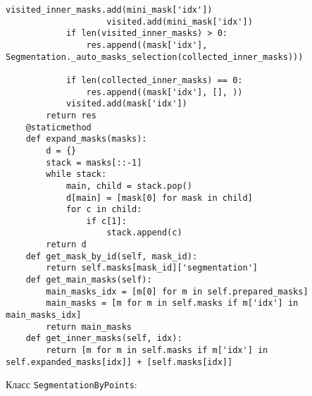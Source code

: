 \begin{lstlisting}[basicstyle=\ttfamily\small]
                    visited_inner_masks.add(mini_mask['idx'])
                    visited.add(mini_mask['idx'])
            if len(visited_inner_masks) > 0:
                res.append((mask['idx'], Segmentation._auto_masks_selection(collected_inner_masks)))

            if len(collected_inner_masks) == 0:
                res.append((mask['idx'], [], ))
            visited.add(mask['idx'])
        return res
    @staticmethod
    def expand_masks(masks):
        d = {}
        stack = masks[::-1]
        while stack:
            main, child = stack.pop()
            d[main] = [mask[0] for mask in child]
            for c in child:
                if c[1]:
                    stack.append(c)
        return d
    def get_mask_by_id(self, mask_id):
        return self.masks[mask_id]['segmentation']
    def get_main_masks(self):
        main_masks_idx = [m[0] for m in self.prepared_masks]
        main_masks = [m for m in self.masks if m['idx'] in main_masks_idx]
        return main_masks
    def get_inner_masks(self, idx):
        return [m for m in self.masks if m['idx'] in self.expanded_masks[idx]] + [self.masks[idx]]
\end{lstlisting}

Класс \lstinline{SegmentationByPoints}:

